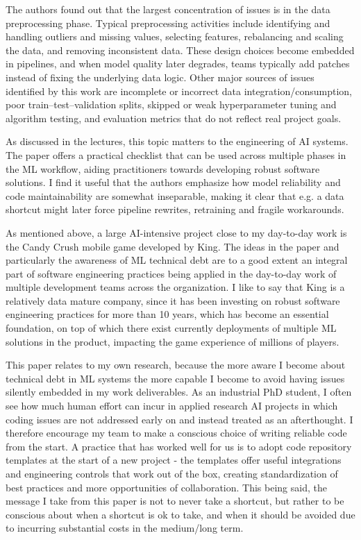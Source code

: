 \documentclass[11pt]{article}
\begin{document}
The authors found out that the largest concentration of issues is in the data preprocessing phase. Typical preprocessing activities include identifying and handling outliers and missing values, selecting features, rebalancing and scaling the data, and removing inconsistent data. These design choices become embedded in pipelines, and when model quality later degrades, teams typically add patches instead of fixing the underlying data logic. Other major sources of issues identified by this work are incomplete or incorrect data integration/consumption, poor train–test–validation splits, skipped or weak hyperparameter tuning and algorithm testing, and evaluation metrics that do not reflect real project goals.

As discussed in the lectures, this topic matters to the engineering of AI systems. The paper offers a practical checklist that can be used across multiple phases in the ML workflow, aiding practitioners towards developing robust software solutions. I find it useful that the authors emphasize how model reliability and code maintainability are somewhat inseparable, making it clear that e.g. a data shortcut might later force pipeline rewrites, retraining and fragile workarounds. 

As mentioned above, a large AI-intensive project close to my day-to-day work is the Candy Crush mobile game developed by King. The ideas in the paper and particularly the awareness of ML technical debt are to a good extent an integral part of software engineering practices being applied in the day-to-day work of multiple development teams across the organization. I like to say that King is a relatively data mature company, since it has been investing on robust software engineering practices for more than 10 years, which has become an essential foundation, on top of which there exist currently deployments of multiple ML solutions in the product, impacting the game experience of millions of players.

This paper relates to my own research, because the more aware I become about technical debt in ML systems the more capable I become to avoid having issues silently embedded in my work deliverables. As an industrial PhD student, I often see how much human effort can incur in applied research AI projects in which coding issues are not addressed early on and instead treated as an afterthought. I therefore encourage my team to make a conscious choice of writing reliable code from the start. A practice that has worked well for us is to adopt code repository templates at the start of a new project - the templates offer useful integrations and engineering controls that work out of the box, creating standardization of best practices and more opportunities of collaboration. This being said, the message I take from this paper is not to never take a shortcut, but rather to be conscious about when a shortcut is ok to take, and when it should be avoided due to incurring substantial costs in the medium/long term.
\end{document}
